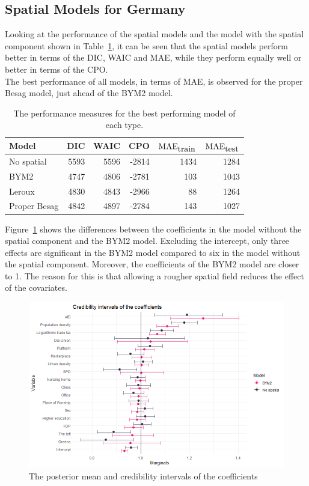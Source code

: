 \subsection{Spatial Models for Germany}\label{sec:spatial_germany}
Looking at the performance of the spatial models and the model with the spatial component shown in Table~\ref{allGermany}, it can be seen that the spatial models perform better in terms of the DIC, WAIC and MAE, while they perform equally well or better in terms of the CPO. \\
The best performance of all models, in terms of MAE, is observed for the proper Besag model, just ahead of the BYM2 model.
\clearpage
\begin{table}[H] 
\caption{The performance measures for the best performing model of each type. \label{allGermany}}
\begin{tabular}{l r r r r r}
\toprule
\textbf{Model}	& \textbf{DIC}	& \textbf{WAIC} & \textbf{CPO} & \textbf{$\hbox{MAE}_{\hbox{train}}$} & \textbf{$\hbox{MAE}_{\hbox{test}}$}\\
\midrule
No spatial & 5593 & 5596 & -2814 & 1434 & 1284 \\
BYM2 & 4747 & 4806 & -2781 & 103 & 1043\\
Leroux & 4830 & 4843 & -2966 & 88 & 1264 \\
Proper Besag & 4842 & 4897 & -2784 & 143 & 1027\\
\bottomrule
\end{tabular}
\end{table}
Figure~\ref{intervalGermany} shows the differences between the coefficients in the model without the spatial component and the BYM2 model. Excluding the intercept, only three effects are significant in the BYM2 model compared to six in the model without the spatial component. Moreover, the coefficients of the BYM2 model are closer to 1. The reason for this is that allowing a rougher spatial field reduces the effect of the covariates.
\begin{figure}[H]
  \centering
  \includegraphics[width = \textwidth]{intervals_germany.png}
  \caption{The posterior mean and credibility intervals of the coefficients}
  \label{intervalGermany}
\end{figure}
